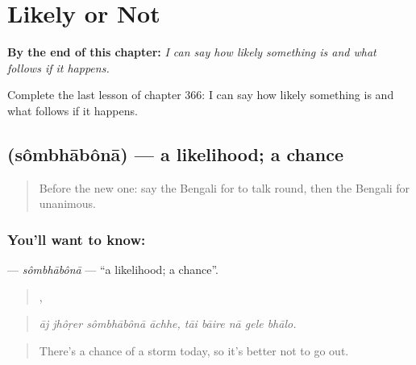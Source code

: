 
\chapter{Likely or Not}
\label{ch:bn-likely-or-not}

\begin{chapteropening}
\textbf{By the end of this chapter:} \emph{I can say how likely something is and what follows if it happens.}

Complete the last lesson of chapter 366: I can say how likely something is and what follows if it happens.
\end{chapteropening}

\section[\texorpdfstring{\bn{সম্ভাবনা} (sômbhābônā)}{সম্ভাবনা (sômbhābônā)}]{ (sômbhābônā) — a likelihood; a chance}

\label{lesson:BN-C366-sombhabona}



\begin{quote}
Before the new one: say the Bengali for to talk round, then the Bengali for unanimous.
\end{quote}

\subsection*{You'll want to know: }
\textbf{} — \emph{sômbhābônā} — \textquotedblleft{}a likelihood; a chance\textquotedblright{}.

\begin{quote}
   ,     
\end{quote}

\begin{quote}
\emph{āj jhôṛer sômbhābônā āchhe, tāi bāire nā gele bhālo.}
\end{quote}

\begin{quote}
There's a chance of a storm today, so it's better not to go out.
\end{quote}

